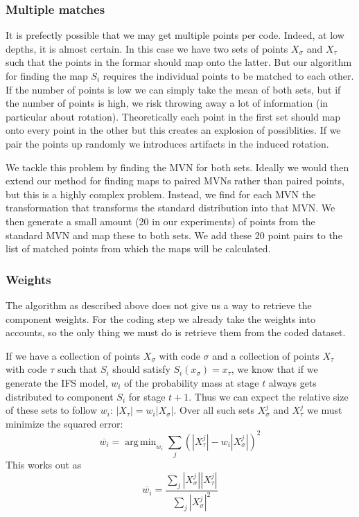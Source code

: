 \documentclass[11pt]{article}
\theoremstyle{definition}
\DeclareMathOperator*{\argmin}{arg\,min}
\begin{document}
\subsubsection{Multiple matches}

It is prefectly possible that we may get multiple points per code. Indeed, at low depths, it is almost certain. In this case we have two sets of points $X_\sigma$ and $X_\tau$ such that the points in the formar should map onto the latter. But our algorithm for finding the map $S_i$ requires the individual points to be matched to each other. If the number of points is low we can simply take the mean of both sets, but if the number of points is high, we risk throwing away a lot of information (in particular about rotation). Theoretically each point in the first set should map onto every point in the other but this creates an explosion of possiblities. If we pair the points up randomly we introduces artifacts in the induced rotation.

We tackle this problem by finding the MVN for both sets. Ideally we would then extend our method for finding maps to paired MVNs rather than paired points, but this is a highly complex problem. Instead, we find for each MVN the transformation that transforms the standard distribution into that MVN. We then generate a small amount (20 in our experiments) of points from the standard MVN and map these to both sets. We add these 20 point pairs to the list of matched points from which the maps will be calculated. 

\subsubsection{Weights}

The algorithm as described above does not give us a way to retrieve the component weights. For the coding step we already take the weights into accounts, so the only thing we must do is retrieve them from the coded dataset. 

If we have a collection of points $X_\sigma$ with code $\sigma$ and a collection of points $X_\tau$ with code $\tau$ such that $S_i$ should satisfy $S_i(x_\sigma) = x_\tau$, we know that if we generate the IFS model, $w_i$ of the probability mass at stage $t$ always gets distributed to component $S_i$ for stage $t + 1$. Thus we can expect the relative size of these sets to follow $w_i$: $|X_\tau| = w_i |X_\sigma|$. Over all such sets $X_\sigma^j$ and $X_\tau^j$ we must minimize the squared error:
\[
\overline{w_i} = \argmin_{w_i} \sum_{j} \left( |X_\tau^j| - w_i |X_\sigma^j| \right)^2
\]
This works out as 
\[
\overline{w_i} = \frac{\sum_{j}|X_\sigma^j||X_\tau^j|}{\sum_{j}|X_\sigma^j|^2}
\]
\end{document}
